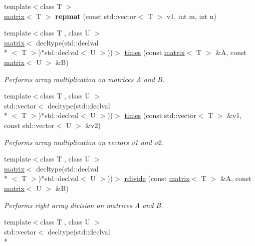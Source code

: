 \begin{DoxyCompactItemize}
\item 
\hypertarget{namespacekeycpp_a59fbea40dfc2d43cd338812f06c4f064}{{\footnotesize template$<$class T $>$ }\\\hyperlink{classkeycpp_1_1matrix}{matrix}$<$ T $>$ {\bfseries repmat} (const std\-::vector$<$ T $>$ v1, int m, int n)}\label{namespacekeycpp_a59fbea40dfc2d43cd338812f06c4f064}

\item 
{\footnotesize template$<$class T , class U $>$ }\\\hyperlink{classkeycpp_1_1matrix}{matrix}$<$ decltype(std\-::declval\\*
$<$ T $>$)$\ast$std\-::declval$<$ U $>$))$>$ \hyperlink{namespacekeycpp_ac1ff99e34619478096c271b38df1f3d7}{times} (const \hyperlink{classkeycpp_1_1matrix}{matrix}$<$ T $>$ \&A, const \hyperlink{classkeycpp_1_1matrix}{matrix}$<$ U $>$ \&B)
\begin{DoxyCompactList}\small\item\em Performs array multiplication on matrices A and B. \end{DoxyCompactList}\item 
{\footnotesize template$<$class T , class U $>$ }\\std\-::vector$<$ decltype(std\-::declval\\*
$<$ T $>$)$\ast$std\-::declval$<$ U $>$))$>$ \hyperlink{namespacekeycpp_a90d5fd4f9f7c52f16425105995655e9d}{times} (const std\-::vector$<$ T $>$ \&v1, const std\-::vector$<$ U $>$ \&v2)
\begin{DoxyCompactList}\small\item\em Performs array multiplication on vectors v1 and v2. \end{DoxyCompactList}\item 
{\footnotesize template$<$class T , class U $>$ }\\\hyperlink{classkeycpp_1_1matrix}{matrix}$<$ decltype(std\-::declval\\*
$<$ T $>$)$\ast$std\-::declval$<$ U $>$))$>$ \hyperlink{namespacekeycpp_aacd37d195541b2313b753b6e8839f916}{rdivide} (const \hyperlink{classkeycpp_1_1matrix}{matrix}$<$ T $>$ \&A, const \hyperlink{classkeycpp_1_1matrix}{matrix}$<$ U $>$ \&B)
\begin{DoxyCompactList}\small\item\em Performs right array division on matrices A and B. \end{DoxyCompactList}\item 
{\footnotesize template$<$class T , class U $>$ }\\std\-::vector$<$ decltype(std\-::declval\\*

\end{DoxyCompactItemize}
